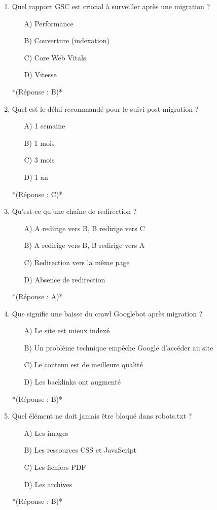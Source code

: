 \documentclass[12pt,a4paper,twoside]{report}
\begin{document}
\begin{enumerate}
\item Quel rapport GSC est crucial à surveiller après une migration ?
\begin{itemize}
\item[A)] Performance
\item[B)] Couverture (indexation)
\item[C)] Core Web Vitals
\item[D)] Vitesse
\end{itemize}
*(Réponse : B)*

\item Quel est le délai recommandé pour le suivi post-migration ?
\begin{itemize}
\item[A)] 1 semaine
\item[B)] 1 mois
\item[C)] 3 mois
\item[D)] 1 an
\end{itemize}
*(Réponse : C)*

\item Qu'est-ce qu'une chaîne de redirection ?
\begin{itemize}
\item[A)] A redirige vers B, B redirige vers C
\item[B)] A redirige vers B, B redirige vers A
\item[C)] Redirection vers la même page
\item[D)] Absence de redirection
\end{itemize}
*(Réponse : A)*

\item Que signifie une baisse du crawl Googlebot après migration ?
\begin{itemize}
\item[A)] Le site est mieux indexé
\item[B)] Un problème technique empêche Google d'accéder au site
\item[C)] Le contenu est de meilleure qualité
\item[D)] Les backlinks ont augmenté
\end{itemize}
*(Réponse : B)*

\item Quel élément ne doit jamais être bloqué dans robots.txt ?
\begin{itemize}
\item[A)] Les images
\item[B)] Les ressources CSS et JavaScript
\item[C)] Les fichiers PDF
\item[D)] Les archives
\end{itemize}
*(Réponse : B)*


\end{enumerate}
\end{document}
